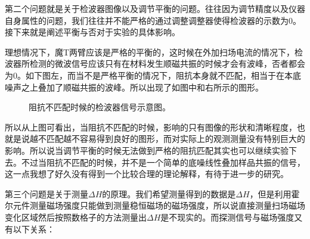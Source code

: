 \documentclass[aps,pre,12pt,preprint,onecolumn,showpacs,showkeys,UTF8]{revtex4-1}
\begin{document}
第二个问题就是关于检波器图像以及调节平衡的问题。往往因为调节精度以及仪器自身属性的问题，我们往往并不能严格的通过调整调整器使得检波器的示数为0。接下来就是阐述平衡与否对于实验的具体影响。

理想情况下，魔T两臂应该是严格的平衡的，这时候在外加扫场电流的情况下，检波器所检测的微波信号应该只有在材料发生顺磁共振的时候才会有波峰，否者都会为0。如下图左，而当不是严格平衡的情况下，阻抗本身就不匹配，相当于在本底噪声之上叠加了顺磁共振的波峰。所以出现了如图中和右所示的图形。

\begin{figure}[h]
	\begin{center}
		\caption{\label{fig:exp3}阻抗不匹配时候的检波器信号示意图。}
	\end{center}
\end{figure}

所以从上图可看出，当阻抗不匹配的时候，影响的只有图像的形状和清晰程度，也就是说越不匹配越不容易得到良好的图形，而对实际上的观测测量没有特别巨大的影响。所以说当调节平衡的时候无法做到严格的阻抗匹配其实也可以继续实验下去。不过当阻抗不匹配的时候，并不是一个简单的底噪线性叠加样品共振的信号，这一点我想了好久没有得到一个比较合理的理论解释，有待于进一步的研究。

第三个问题是关于测量$\Delta H$的原理。我们希望测量得到的数据是$\Delta H$，但是利用霍尔元件测量磁场强度只能做到测量稳恒磁场的磁场强度，所以说直接测量扫场磁场变化区域然后按照数格子的方法测量出$\Delta H$是不现实的。而探测信号与磁场强度又有以下关系：
\end{document}
